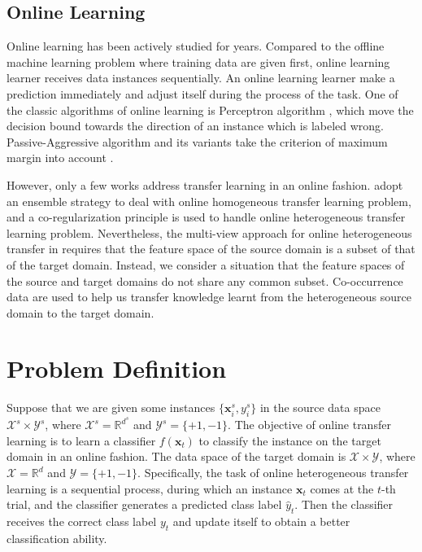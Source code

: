 \documentclass{article} %
\theoremstyle{remark}
\theoremstyle{definition}
\begin{document}
\subsection{Online Learning}
Online learning has been actively studied for years.
Compared to the offline machine learning problem where training data are given first, online learning learner receives data instances sequentially.
An online learning learner make a prediction immediately and adjust itself during the process of the task.
One of the classic algorithms of online learning is Perceptron algorithm \cite{rosenblatt1958perceptron}, which move the decision bound towards the direction of an instance which is labeled wrong.
Passive-Aggressive algorithm and its variants take the criterion of maximum margin into account \cite{crammer2006online}.

However, only a few works address transfer learning in an online fashion.
\cite{zhao2010otl,zhao2014online} adopt an ensemble strategy to deal with online homogeneous transfer learning problem, and a co-regularization principle is used to handle online heterogeneous transfer learning problem.
Nevertheless, the multi-view approach for online heterogeneous transfer in \cite{zhao2010otl,zhao2014online} requires that the feature space of the source domain is a subset of that of the target domain.
Instead, we consider a situation that the feature spaces of the source and target domains do not share any common subset.
Co-occurrence data are used to help us transfer knowledge learnt from the heterogeneous source domain to the target domain.

\section{Problem Definition}

Suppose that we are given some instances $\{\mathbf{x}_{i}^{s}, y_{i}^{s}\}$ in the source data space $\mathcal{X}^{s} \times \mathcal{Y}^{s}$, where $\mathcal{X}^{s} = \mathbb{R}^{d^s}$ and $\mathcal{Y}^{s} = \{+1,-1\}$.
The objective of online transfer learning is to learn a classifier $f(\mathbf{x}_{t})$ to classify the instance on the target domain in an online fashion.
The data space of the target domain is $\mathcal{X} \times \mathcal{Y}$, where $\mathcal{X} = \mathbb{R}^{d}$ and $\mathcal{Y} = \{+1,-1\}$.
Specifically, the task of online heterogeneous transfer learning is a sequential process, during which an instance $\mathbf{x}_t$ comes at the $t$-th trial, and the classifier generates a predicted class label $\hat{y}_{t}$.
Then the classifier receives the correct class label $y_t$ and update itself to obtain a better classification ability.
\end{document}
